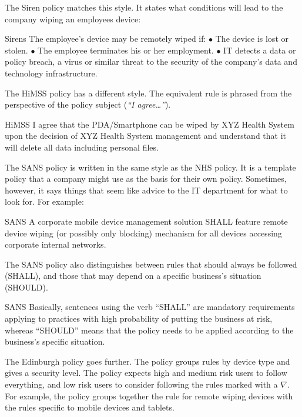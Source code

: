 \documentclass[thesis.tex]{subfiles}
\begin{document}
The Siren policy matches this style. It states what conditions will lead to the
company wiping an employees device:

\begin{policyrule}{Sirens}
The employee's device may be remotely wiped if: $\bullet$ The device is lost or
stolen. $\bullet$ The employee terminates his or her employment. $\bullet$ IT
detects a data or policy breach, a virus or similar threat to the security of
the company's data and technology infrastructure.
\end{policyrule}

The \ac{HiMSS} policy has a different style.
The equivalent rule is phrased from the perspective of the policy subject
(\emph{``I agree\dots''}).

\begin{policyrule}{HiMSS}
  I agree that the PDA/Smartphone can be wiped by XYZ Health System upon the
  decision of XYZ Health System management and understand that it will delete all
  data including personal files.
\end{policyrule}

The SANS policy is written in the same style as the NHS policy.  It is
a template policy that a company might use as the basis for their
own policy. Sometimes, however, it says things that seem like advice to the IT
department for what to look for.  For example:

\begin{policyrule}{SANS}
   A corporate mobile device management solution SHALL feature remote device
   wiping (or possibly only blocking) mechanism for all devices accessing
   corporate internal networks.
\end{policyrule}

The SANS policy also distinguishes between rules that should always be followed (SHALL),
and those that may depend on a specific business's situation (SHOULD).

\begin{policyrule}{SANS}
  Basically, sentences using the verb ``SHALL'' are mandatory requirements
  applying to practices with high probability of putting the business at risk,
  whereas ``SHOULD'' means that the policy needs to be applied according to the
  business's specific situation.
\end{policyrule}

The Edinburgh policy goes further. The policy groups rules by device type
and gives a security level.  The policy expects high and medium risk users
to follow everything, and low risk users to
consider following the rules marked with a $\nabla$.  For example, the policy groups together the
rule for remote wiping devices with the rules specific to mobile
devices and tablets. 
\end{document}
